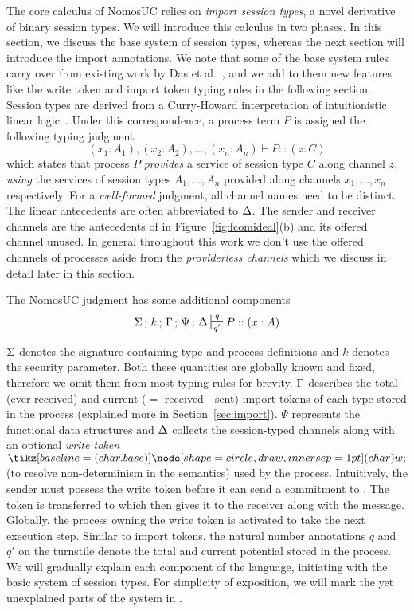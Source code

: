 
The core calculus of NomosUC relies on \emph{import session types}, a novel derivative of
binary session types.
We will introduce this calculus in two phases.
In this section, we discuss the base system of session types, whereas the next section
will introduce the import annotations.
We note that some of the base system rules carry over from existing work by Das et al.~\cite{Das20FSCD}, and we add to them new features like the write token and import token typing rules in the following section. 
Session types are derived from a Curry-Howard interpretation of intuitionistic linear logic~\cite{girard1987linear}.
Under this correspondence, a process term $P$ is assigned the following typing judgment
\[
(x_1 : A_1), (x_2 : A_2), \ldots, (x_n : A_n) \vdash P :: (z : C)
\]
which states that process $P$ \emph{provides} a service
of session type $C$ along channel $z$, \emph{using} the services of session
types $A_1, \ldots, A_n$ provided along channels $x_1, \ldots, x_n$ respectively.
For a \emph{well-formed} judgment, all channel names need to be distinct.
The linear antecedents are often abbreviated to $\Delta$.
The sender and receiver channels are the antecedents of \Fcom in Figure~\ref{fig:fcomideal}(b) 
and its offered channel  unused.
In general throughout this work we don't use the offered channels of processes 
aside from the \emph{providerless channels} which we discuss in detail later in this
section. 

The NomosUC judgment has some additional components
\[
\Sg \semi k \semi \Tokens \semi \Psi \semi \D \entailpot{q}{q'} P :: (x : A)
\]

$\Sigma$ denotes the signature containing type and process definitions and $k$
denotes the security parameter.
Both these quantities are globally known and fixed, therefore we omit them from
most typing rules for brevity.
$\Gamma$ describes the total (ever received) and current ($=$ received - sent) import tokens
of each type stored in the process (explained more in Section~\ref{sec:import}).
$\Psi$ represents the functional data structures and $\Delta$ collects the
session-typed channels along with an optional \emph{write token} $\wt$
(to resolve non-determinism in the semantics) used by the process.
Intuitively, the sender must possess the write token before it can 
send a commitment to \Fcom. The token is transferred to \Fcom which then 
gives it to the receiver along with the  message.
Globally, the process owning the write token is activated to take the
next execution step.
Similar to import tokens, the natural number annotations $q$ and $q'$ on the turnstile
denote the total and current potential stored in the process.
We will gradually explain each component of the language, initiating
with the basic system of session types.
For simplicity of exposition, we will mark the yet unexplained
parts of the system in .

